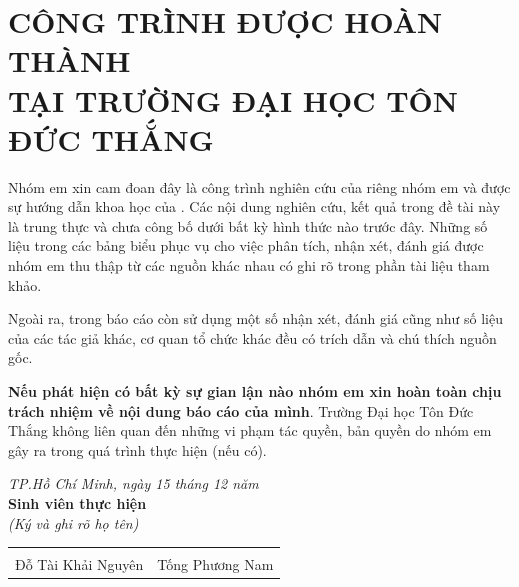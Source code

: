 \section*{CÔNG TRÌNH ĐƯỢC HOÀN THÀNH\\TẠI TRƯỜNG ĐẠI HỌC TÔN ĐỨC THẮNG}

	Nhóm em xin cam đoan đây là công trình nghiên cứu của riêng nhóm em và được sự hướng dẫn khoa học của \gvhd. Các nội dung nghiên cứu, kết quả trong đề tài này là trung thực và chưa công bố dưới bất kỳ hình thức nào trước đây. Những số liệu trong các bảng biểu phục vụ cho việc phân tích, nhận xét, đánh giá được nhóm em thu thập từ các nguồn khác nhau có ghi rõ trong phần tài liệu tham khảo.
 
	Ngoài ra, trong báo cáo còn sử dụng một số nhận xét, đánh giá cũng như số liệu của các tác giả khác, cơ quan tổ chức khác đều có trích dẫn và chú thích nguồn gốc.
 
	\textbf{Nếu phát hiện có bất kỳ sự gian lận nào nhóm em xin hoàn toàn chịu trách nhiệm về nội dung báo cáo của mình}. Trường Đại học Tôn Đức Thắng không liên quan đến những vi phạm tác quyền, bản quyền do nhóm em gây ra trong quá trình thực hiện (nếu có).

\vspace{0.5cm}
\begin{flushright}
    \begin{minipage}[t]{0.6\textwidth}
        \raggedleft
        \textit{TP.Hồ Chí Minh, ngày 15 tháng 12 năm \nam}\\[0.3cm]
        \textbf{Sinh viên thực hiện}\\[0.2cm]
        \textit{(Ký và ghi rõ họ tên)}\\[1.8cm]
        \begin{tabular}{cc}
            \underline{\hspace{5cm}} & \underline{\hspace{5cm}} \\
            Đỗ Tài Khải Nguyên & Tống Phương Nam \\
        \end{tabular}
    \end{minipage}
\end{flushright}
